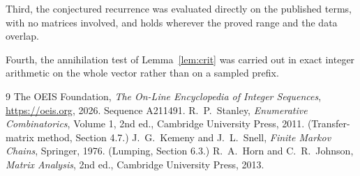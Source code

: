 \documentclass[11pt,a4paper]{article}
\theoremstyle{plain}
\theoremstyle{definition}
\begin{document}
Third, the conjectured recurrence was evaluated directly on the published terms, with no
matrices involved, and holds wherever the proved range and the data overlap.

Fourth, the annihilation test of Lemma~\ref{lem:crit} was carried out in exact integer
arithmetic on the whole vector rather than on a sampled prefix.

\begin{thebibliography}{9}
 The OEIS Foundation, \emph{The On-Line Encyclopedia of Integer
Sequences}, \url{https://oeis.org}, 2026. Sequence A211491.
 R.~P.~Stanley, \emph{Enumerative Combinatorics}, Volume 1, 2nd ed.,
Cambridge University Press, 2011. (Transfer-matrix method, Section 4.7.)
 J.~G.~Kemeny and J.~L.~Snell, \emph{Finite Markov Chains}, Springer, 1976.
(Lumping, Section 6.3.)
 R.~A.~Horn and C.~R.~Johnson, \emph{Matrix Analysis}, 2nd ed., Cambridge
University Press, 2013.
\end{thebibliography}
\end{document}
